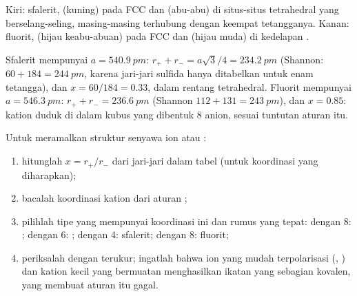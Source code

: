 \begin{omfigure}

{\small Kiri: sfalerit,  (kuning) pada  FCC dan
 (abu-abu) di situs-situs tetrahedral yang berselang-seling,
masing-masing terhubung dengan keempat tetangganya. Kanan: fluorit,
 (hijau keabu-abuan) pada  FCC dan  (hijau muda)
di kedelapan .}
\end{omfigure}

\begin{example}\label{ex:b1:crystals-ionic-covalent:zns}
Sfalerit mempunyai $a = \qty{540.9}{pm}$: $r_+ + r_- = a\sqrt3/4 =
\qty{234.2}{pm}$ (Shannon: $60 + 184 = \qty{244}{pm}$, karena jari-jari
sulfida hanya ditabelkan untuk enam tetangga), dan $x = 60/184 = 0.33$,
dalam rentang tetrahedral. Fluorit mempunyai $a = \qty{546.3}{pm}$:
$r_+ + r_- =
\qty{236.6}{pm}$ (Shannon $112 + 131 = \qty{243}{pm}$), dan
$x = 0.85$: kation duduk di dalam kubus yang dibentuk 8 anion, sesuai
tuntutan aturan itu.
\end{example}

\begin{method}\label{met:b1:crystals-ionic-covalent:predict}
Untuk meramalkan struktur senyawa ion  atau :
\begin{enumerate}
  \item hitunglah $x = r_+/r_-$ dari jari-jari dalam tabel (untuk
        koordinasi yang diharapkan);
  \item bacalah koordinasi kation dari aturan ;
  \item pilihlah tipe yang mempunyai koordinasi ini dan rumus yang
        tepat:  dengan 8: ; dengan 6: ; dengan 4:
        sfalerit;  dengan 8: fluorit;
  \item periksalah dengan  terukur; ingatlah bahwa ion
        yang mudah terpolarisasi (, ) dan kation kecil
        yang bermuatan menghasilkan ikatan yang sebagian kovalen, yang
        membuat aturan itu gagal.
\end{enumerate}
\end{method}

